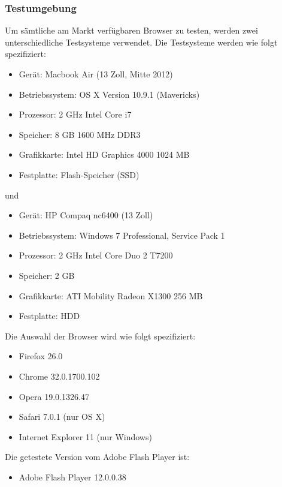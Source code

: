 \subsubsection{Testumgebung}

Um sämtliche am Markt verfügbaren Browser zu testen, werden zwei
unterschiedliche Testsysteme verwendet. Die Testsysteme werden wie folgt
spezifiziert:
\begin{itemize}
  \item Gerät: Macbook Air (13 Zoll, Mitte 2012)
  \item Betriebssystem: OS X Version 10.9.1 (Mavericks)
  \item Prozessor: 2 GHz Intel Core i7
  \item Speicher: 8 GB 1600 MHz DDR3
  \item Grafikkarte: Intel HD Graphics 4000 1024 MB
  \item Festplatte: Flash-Speicher (SSD)
\end{itemize}
und
\begin{itemize}
  \item Gerät: HP Compaq nc6400 (13 Zoll)
  \item Betriebssystem: Windows 7 Professional, Service Pack 1
  \item Prozessor: 2 GHz Intel Core Duo 2 T7200
  \item Speicher: 2 GB
  \item Grafikkarte: ATI Mobility Radeon X1300 256 MB
  \item Festplatte: HDD
\end{itemize}
Die Auswahl der Browser wird wie folgt spezifiziert:
\begin{itemize}
  \item Firefox 26.0
  \item Chrome 32.0.1700.102
  \item Opera 19.0.1326.47
  \item Safari 7.0.1 (nur OS X)
  \item Internet Explorer 11 (nur Windows)
\end{itemize}
Die getestete Version vom Adobe Flash Player ist:
\begin{itemize}
  \item Adobe Flash Player 12.0.0.38
\end{itemize}


